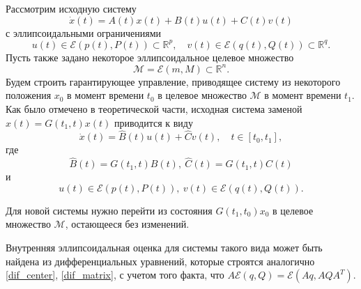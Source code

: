 Рассмотрим исходную систему
\begin{equation*}
    \dot{x}(t) = A(t) x(t) + B(t) u(t) + C(t) v(t)
\end{equation*}
с эллипсоидальными ограничениями
\begin{equation*}
    u(t) \in \mathcal{E}(p(t), P(t)) \subset \mathbb{R}^p, \quad v(t) \in \mathcal{E}(q(t), Q(t)) \subset \mathbb{R}^q.
\end{equation*}
Пусть также задано некоторое эллипсоидальное целевое множество
\begin{equation*}
    \mathcal{M} = \mathcal{E}(m, M) \subset \mathbb{R}^n.
\end{equation*}
Будем строить гарантирующее управление, приводящее систему из некоторого положения 
\( x_0 \) в момент времени \( t_0 \) в целевое множество \( \mathcal{M} \) в момент времени \( t_1 \). Как было отмечено в теоретической части,
 исходная система заменой \( x(t) = G(t_1, t) x(t) \) приводится к виду
\begin{equation*}
    \dot{x}(t) = \hat{B}(t)u(t) + \hat{C}v(t), \quad t \in [t_0, t_1],
\end{equation*}
где 
\begin{equation*}
    \hat{B}(t) = G(t_1, t)B(t), \ \hat{C}(t) = G(t_1, t) C(t)
\end{equation*}
и
\begin{equation*}
    u(t) \in \mathcal{E}(p(t), P(t)), \ v(t) \in \mathcal{E}(q(t), Q(t)).
\end{equation*}

Для новой системы нужно перейти из состояния \( G(t_1, t_0) x_0 \) в целевое множество \( \mathcal{M} \), остающееся без изменений.

Внутренняя эллипсоидальная оценка для системы такого вида может быть найдена из дифференциальных уравнений, которые строятся
 аналогично \eqref{dif_center}, \eqref{dif_matrix}, с учетом того факта, что  \( A \mathcal{E}(q, Q) = \mathcal{E}(Aq, AQA^T) \).


